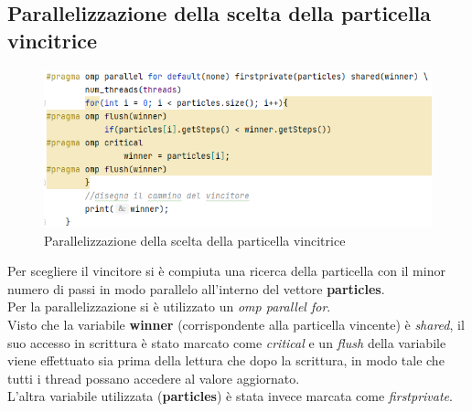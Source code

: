 \documentclass[10pt,twocolumn,letterpaper]{article}
\begin{document}
\subsection{Parallelizzazione della scelta della particella vincitrice}
\begin{figure}[H]
\includegraphics[width=1\linewidth]{code/par2.png}
\caption{\small Parallelizzazione della scelta della particella vincitrice}
\label{par2}
\end{figure}
Per scegliere il vincitore si è compiuta una ricerca della particella con il minor numero di passi in modo parallelo all'interno del vettore \textbf{particles}.\\
Per la parallelizzazione si è utilizzato un \textit{omp parallel for}.\\
Visto che la variabile \textbf{winner} (corrispondente alla particella vincente) è \textit{shared}, il suo accesso in scrittura è stato marcato come \textit{critical} e un \textit{flush} della variabile viene effettuato sia prima della lettura che dopo la scrittura, in modo tale che tutti i thread possano accedere al valore aggiornato.\\
L'altra variabile utilizzata (\textbf{particles}) è stata invece marcata come \textit{firstprivate}.
\end{document}
